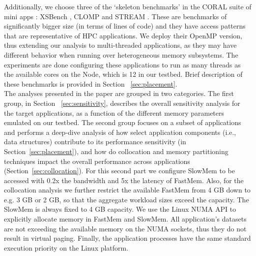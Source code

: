 Additionally, we choose three of the `skeleton benchmarks' in the
CORAL suite of mini apps \cite{coral:suite}: XSBench \cite{Tramm:wy},
CLOMP \cite{Bronevetsky:2008} and STREAM \cite{stream}. These are
benchmarks of significantly bigger size  (in terms of lines of code)
and they have access patterns that are representative of HPC
applications. We deploy their OpenMP version, thus extending our
analysis to multi-threaded applications, as they may have different
behavior when running over heterogeneous memory subsystems. The
experiments are done configuring these applications to run as many
threads as the available cores on the Node, which is 12 in our
testbed. Brief description of these benchmarks is provided in Section ~\ref{sec:placement}.\\

 The analyses presented in the paper are
grouped in two categories. The first group, in Section ~\ref{sec:sensitivity}, describes the overall
sensitivity analysis for the target applications, as a function of the
different memory parameters emulated on our testbed. 
The second group 
focuses on a subset of applications and performs a deep-dive analysis 
of how select application components (i.e., data structures)
contribute to its performance sensitivity (in
Section~\ref{sec:placement}), and how do collocation and memory
partitioning techniques impact the overall performance across
applications (Section~\ref{sec:collocation}). For this second part 
we configure SlowMem to be accessed with 0.2x the bandwidth and 5x
the latency of FastMem. Also, for the collocation analysis we further restrict the available FastMem from 4 GB down to e.g. 3 GB or 2 GB, so that the aggregate workload sizes exceed the capacity. The SlowMem is always fixed to 4 GB capacity.
We use the Linux NUMA API to  
explicitly allocate memory in FastMem and SlowMem. All application's datasets are not exceeding the available memory on the NUMA sockets, thus they do not result in virtual paging. Finally, the application processes have the same standard execution priority on the Linux platform.



